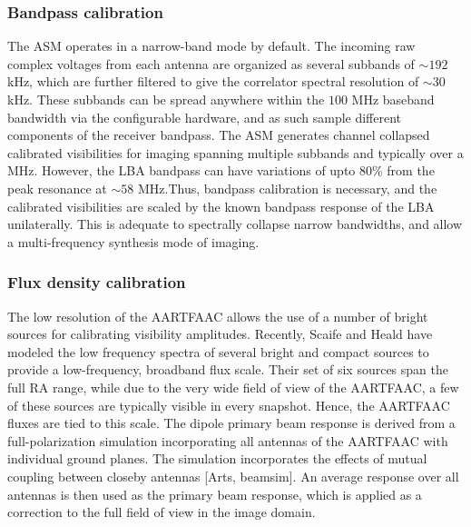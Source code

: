 \documentclass{aa}
\begin{document}


\subsubsection{Bandpass calibration}

The ASM  operates in  a narrow-band  mode by default.  The incoming  raw complex
voltages from each antenna are organized as several subbands of $\sim$$192$ kHz,
which  are further  filtered to  give  the correlator  spectral resolution  of
$\sim$$30$  kHz. These  subbands can  be spread  anywhere within  the  $100$ MHz
baseband bandwidth via  the configurable hardware, and as  such sample different
components  of  the  receiver  bandpass.  The ASM  generates  channel  collapsed
calibrated  visibilities for  imaging spanning  multiple subbands  and typically
over a MHz. However, the LBA bandpass  can have variations of upto 80\% from the
peak  resonance   at  $\sim$$58$  MHz\citep{vanhaarlem2013lofar}.Thus,  bandpass
calibration  is necessary,  and the  calibrated visibilities  are scaled  by the
known bandpass response of the  LBA unilaterally. This is adequate to spectrally
collapse  narrow  bandwidths, and  allow  a  multi-frequency  synthesis mode  of
imaging.


\subsubsection{Flux density calibration}

The low resolution of the AARTFAAC allows  the use of a number of bright sources
for    calibrating     visibility    amplitudes.     Recently,     Scaife    and
Heald\citep{scaife2012broad} have  modeled the low frequency  spectra of several
bright  and   compact  sources  to  provide  a   low-frequency,  broadband  flux
scale. Their set  of six sources span the  full RA range, while due  to the very
wide field of view of the AARTFAAC, a few of these sources are typically visible
in  every snapshot.   Hence, the  AARTFAAC fluxes  are tied  to this  scale. The
dipole  primary beam  response is  derived from  a  full-polarization simulation
incorporating all  antennas of the  AARTFAAC with individual ground  planes. The
simulation incorporates the effects  of mutual coupling between closeby antennas
{[}Arts, beamsim{]}. An  average response over all antennas is  then used as the
primary beam  response, which is  applied as a  correction to the full  field of
view in the image domain.
\end{document}
